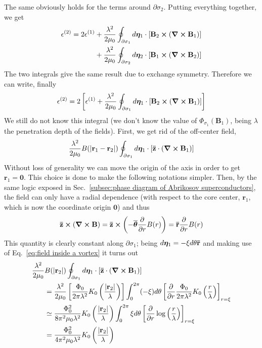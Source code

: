 The same obviously holds for the terms around $\partial\sigma_2$. Putting everything together, we get
\[
\begin{aligned}
	\epsilon^{(2)} = 2 \epsilon^{(1)} &+ \frac{\lambda^2}{2\mu_0} \oint_{\partial\sigma_1} d\bm\eta_1 \cdot \left[{ \mathbf{B}_2 \bm{\times} \left({\curl\mathbf{B}_1 }\right) }\right] \\
	&+ \frac{\lambda^2}{2\mu_0} \oint_{\partial\sigma_2} d\bm\eta_2 \cdot \left[{ \mathbf{B}_1 \bm{\times} \left({\curl\mathbf{B}_2 }\right) }\right]
\end{aligned}
\]
The two integrals give the same result due to exchange symmetry. Therefore we can write, finally
\[
	\epsilon^{(2)} = 2 \left[{ \epsilon^{(1)} + \frac{\lambda^2}{2\mu_0} \oint_{\partial\sigma_1} d\bm\eta_1 \cdot \left[{ \mathbf{B}_2 \bm{\times} \left({\curl\mathbf{B}_1 }\right) }\right] }\right]
\]
We still do not know this integral (we don't know the value of $\Phi_{\sigma_1}(\mathbf{B}_1)$, being $\lambda$ the penetration depth of the fields).
First, we get rid of the off-center field,
\[
	\frac{\lambda^2}{2\mu_0} B(\abs{\mathbf{r}_1-\mathbf{r}_2}) \oint_{\partial\sigma_1} d\bm\eta_1 \cdot \left[{ \mathbf{\bar{z}}\cdot \left({\curl\mathbf{B}_1 }\right) }\right]
\]
Without loss of generality we can move the origin of the axis in order to get $\mathbf{r}_1 = \mathbf{0}$. This choice is done to make the following notations simpler. Then, by the same logic exposed in Sec.~\ref{subsec:phase diagram of Abrikosov superconductors}, the field can only have a radial dependence (with respect to the core center, $\mathbf{r}_1$, which is now the coordinate origin $\mathbf{0}$) and thus
\[
	\mathbf{\bar{z}} \bm{\times} \left({\curl\mathbf{B}}\right) = \mathbf{\bar{z}} \bm\times \left({-\overline{\bm\theta} \pdv{}{r} B(r)}\right) = \mathbf{\bar{r}} \pdv{}{r} B(r)
\]
This quantity is clearly constant along $\partial\sigma_1$; being $d\bm\eta_1 = -\xi d\theta \mathbf{\bar{r}}$ and making use of Eq.~\eqref{eq:field inside a vortex} it turns out
\[
\begin{aligned}
	\frac{\lambda^2}{2\mu_0} &B(\abs{\mathbf{r}_2}) \oint_{\partial\sigma_1} d\bm\eta_1 \cdot \left[{ \mathbf{\bar{z}}\cdot \left({\curl\mathbf{B}_1 }\right) }\right] \\
	&= \frac{\lambda^2}{2\mu_0} \left[{ \frac{\Phi_0}{2\pi\lambda^2} K_0 \left({\frac{\abs{\mathbf{r}_2}}{\lambda}}\right) }\right] \int_0^{2\pi} (-\xi) d\theta \left[{\pdv{}{r} \frac{\Phi_0}{2\pi\lambda^2} K_0 \left({\frac{r}{\lambda}}\right) }\right]_{r=\xi} \\
	&\simeq \frac{\Phi_0^2}{8\pi^2\mu_0 \lambda^2} K_0 \left({\frac{\abs{\mathbf{r}_2}}{\lambda}}\right) \int_0^{2\pi} \xi d\theta \left[{\pdv{}{r} \log\left({\frac{r}{\lambda}}\right) }\right]_{r=\xi} \\
	&= \frac{\Phi_0^2}{4\pi^2\mu_0 \lambda^2} K_0 \left({\frac{\abs{\mathbf{r}_2}}{\lambda}}\right)
\end{aligned}
\]

